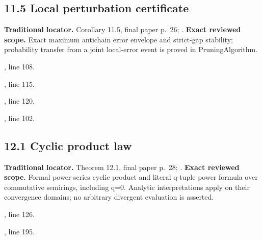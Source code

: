 \subsection{11.5 Local perturbation certificate}
\label{result:11.5}
\textbf{Traditional locator.} Corollary 11.5, final paper p.~26; .
\textbf{Exact reviewed scope.} Exact maximum antichain error envelope and strict-gap stability; probability transfer from a joint local-error event is proved in PruningAlgorithm.
{\small{}\par}
{\footnotesize\color{muted}, line 108.\par}\smallskip
{\small{}\par}
{\footnotesize\color{muted}, line 115.\par}\smallskip
{\small{}\par}
{\footnotesize\color{muted}, line 120.\par}\smallskip
{\small{}\par}
{\footnotesize\color{muted}, line 102.\par}\smallskip
{}
\subsection{12.1 Cyclic product law}
\label{result:12.1}
\textbf{Traditional locator.} Theorem 12.1, final paper p.~28; .
\textbf{Exact reviewed scope.} Formal power-series cyclic product and literal q-tuple power formula over commutative semirings, including q=0. Analytic interpretations apply on their convergence domains; no arbitrary divergent evaluation is asserted.
{\small{}\par}
{\footnotesize\color{muted}, line 126.\par}\smallskip
{\small{}\par}
{\footnotesize\color{muted}, line 195.\par}\smallskip
{}
